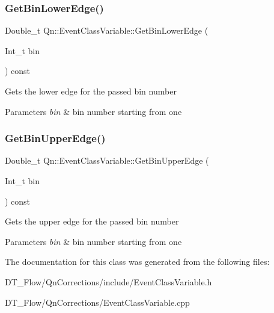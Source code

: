 \subsubsection{\texorpdfstring{Get\+Bin\+Lower\+Edge()}{GetBinLowerEdge()}}
{\footnotesize\ttfamily Double\+\_\+t Qn\+::\+Event\+Class\+Variable\+::\+Get\+Bin\+Lower\+Edge (\begin{DoxyParamCaption}\item[{Int\+\_\+t}]{bin }\end{DoxyParamCaption}) const\hspace{0.3cm}{\ttfamily [inline]}}

Gets the lower edge for the passed bin number 
\begin{DoxyParams}{Parameters}
{\em bin} & bin number starting from one \\
\hline
\end{DoxyParams}
\mbox{\label{classQn_1_1EventClassVariable_a457a9a46cdfd22f3496da1e113baba3d}} 
\subsubsection{\texorpdfstring{Get\+Bin\+Upper\+Edge()}{GetBinUpperEdge()}}
{\footnotesize\ttfamily Double\+\_\+t Qn\+::\+Event\+Class\+Variable\+::\+Get\+Bin\+Upper\+Edge (\begin{DoxyParamCaption}\item[{Int\+\_\+t}]{bin }\end{DoxyParamCaption}) const\hspace{0.3cm}{\ttfamily [inline]}}

Gets the upper edge for the passed bin number 
\begin{DoxyParams}{Parameters}
{\em bin} & bin number starting from one \\
\hline
\end{DoxyParams}


The documentation for this class was generated from the following files\+:\begin{DoxyCompactItemize}
\item 
D\+T\+\_\+\+Flow/\+Qn\+Corrections/include/Event\+Class\+Variable.\+h\item 
D\+T\+\_\+\+Flow/\+Qn\+Corrections/Event\+Class\+Variable.\+cpp\end{DoxyCompactItemize}

